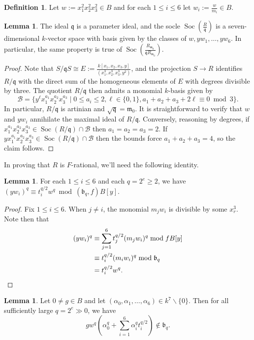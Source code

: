 \documentclass[reqno,11pt]{amsart}
\numberwithin{equation}{section}
\theoremstyle{definition}
\theoremstyle{definition}
\newtheorem{lemma}[theorem]{Lemma}
\theoremstyle{definition}
\newtheorem{definition}[theorem]{Definition}
\theoremstyle{remark}
\newcommand{\Soc}{\operatorname{Soc}}
\newcommand{\fm}{\mathfrak{m}}
\newcommand{\fq}{\mathfrak{q}}
\newcommand{\fb}{\mathfrak{b}}
\begin{document}
\begin{definition}
    Let $w:=x_1^2x_2^2x_3^2\in B$ and for each $1\leq i\leq 6$ let $w_i:=\frac{w}{m_i}\in B$.
\end{definition}
\begin{lemma}
    The ideal $\fq$ is a parameter ideal, and the socle $\Soc\left(\frac{R}{\fq}\right)$ is a seven-dimensional $k$-vector space with basis given by the classes of $w,yw_1,\ldots, yw_6.$ In particular, the same property is true of $\Soc\left(\frac{R_{\fm_0}}{\fq R_{\fm_0}}\right)$.
\end{lemma}
\begin{proof}
    Note that $S/\fq S\cong E:=\frac{k[x_1,x_2,x_3,y]}{(x_1^3,x_2^3,x_3^3,y^2)}$, and the projection $S\to R$ identifies $R/\fq$ with the direct sum of the homogeneous elements of $E$ with degrees divisible by three. The quotient $R/\fq$ then admits a monomial $k$-basis given by $$\mathcal{B}=\{y^\ell x_1^{a_1}x_2^{a_2}x_3^{a_3}\mid 0\leq a_i\leq 2, \ell\in\{0,1\}, a_1+a_2+a_3+2\ell\equiv 0\bmod 3\}.$$ In particular, $R/\fq$ is artinian and $\sqrt{\fq}=\fm_0$. It is straightforward to verify that $w$ and $yw_i$ annihilate the maximal ideal of $R/\fq$. Conversely, reasoning by degrees, if $x_1^{a_1}x_2^{a_2}x_3^{a_3}\in\Soc(R/\fq)\cap\mathcal{B}$ then $a_1=a_2=a_3=2$. If $yx_1^{a_1}x_2^{a_2}x_3^{a_3}\in\Soc(R/\fq)\cap\mathcal{B}$ then the bounds force $a_1+a_2+a_3=4$, so the claim follows.
\end{proof}
In proving that $R$ is $F$-rational, we'll need the following identity.
\begin{lemma}\label{lem:congruence}
    For each $1\leq i\leq 6$ and each $q=2^e\geq 2$, we have $(yw_i)^q\equiv t_i^{q/2}w^q\bmod (\fb_q,f)B[y]$.
\end{lemma}
\begin{proof}
Fix $1\leq i\leq 6$. When $j\neq i$, the monomial $m_j w_i$ is divisible by some $x_r^3$. Note then that
\begin{align*}
    (yw_i)^q&\equiv \sum\limits_{j=1}^6 t_j^{q/2}(m_jw_i)^q\bmod fB[y]\\
    &\equiv t_i^{q/2} (m_i w_i)^q\bmod \fb_q\\
    &=t_i^{q/2} w^q. \qedhere
\end{align*}
\end{proof}
\begin{lemma}\label{lem:tight-closure}
    Let $0\neq g\in B$ and let $(\alpha_0,\alpha_1,\ldots, \alpha_6)\in k^7\smallsetminus\{0\}$. Then for all sufficiently large $q=2^e\gg 0$, we have 
\begin{equation}
gw^q\left(\alpha_0^q+\sum\limits_{i=1}^6\alpha_i^q t_i^{q/2}\right)\not\in \fb_q.\label{eq:deg-lemma}
\end{equation}
\end{lemma}
\end{document}
